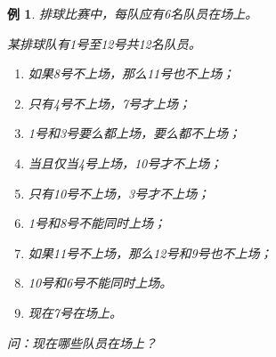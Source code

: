 \documentclass[12pt,onecolumn,a4paper]{book}
\newtheorem*{example}{例}
\numberwithin{table}{subsection}
\numberwithin{equation}{subsection}
\begin{document}
\begin{example}
    排球比赛中，每队应有6名队员在场上。
    
    某排球队有1号至12号共12名队员。
    
    \begin{enumerate}[itemsep=0pt,parsep=0pt]
        \item 如果8号不上场，那么11号也不上场；
        \item 只有4号不上场，7号才上场；
        \item 1号和3号要么都上场，要么都不上场；
        \item 当且仅当4号上场，10号才不上场；
        \item 只有10号不上场，3号才不上场；
        \item 1号和8号不能同时上场；
        \item 如果11号不上场，那么12号和9号也不上场；
        \item 10号和6号不能同时上场。
        \item 现在7号在场上。
    \end{enumerate}
    问：现在哪些队员在场上？


\end{example}
\end{document}
